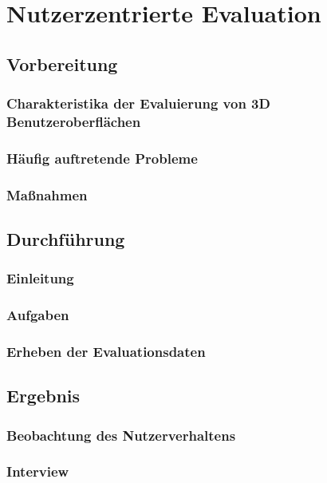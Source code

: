 \chapter{Nutzerzentrierte Evaluation}

\section{Vorbereitung}

\subsection{Charakteristika der Evaluierung von 3D Benutzeroberflächen}

\subsection{Häufig auftretende Probleme}

\subsection{Maßnahmen}

\section{Durchführung}

\subsection{Einleitung}

\subsection{Aufgaben}

\subsection{Erheben der Evaluationsdaten}

\section{Ergebnis}

\subsection{Beobachtung des Nutzerverhaltens}

\subsection{Interview}

